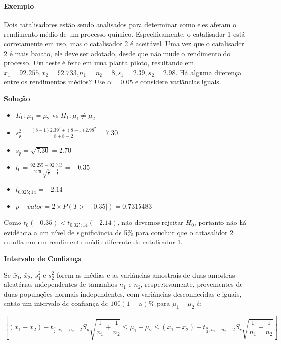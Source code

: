 \documentclass[
]{book}
\providecommand{\tightlist}{%
  \setlength{\itemsep}{0pt}\setlength{\parskip}{0pt}}
\begin{document}
\hypertarget{exemplo-11}{%
\paragraph{Exemplo}\label{exemplo-11}}

Dois catalisadores estão sendo analisados para determinar como eles afetam o rendimento médio de um processo químico. Especificamente, o catalisador 1 está corretamente em uso, mas o catalisador 2 é aceitável. Uma vez que o catalisador 2 é mais barato, ele deve ser adotado, desde que não mude o rendimento do processo. Um teste é feito em uma planta piloto, resultando em \(\bar x_1=92.255, \bar x_2=92.733, n_1=n_2=8, s_1=2.39, s_2=2.98\). Há alguma diferença entre os rendimentos médios? Use \(\alpha=0.05\) e considere variâncias iguais.

\textbf{Solução}

\begin{itemize}
\tightlist
\item
  \(H_0: \mu_1=\mu_2\) vs \(H_1: \mu_1\ne\mu_2\)
\item
  \(s^2_p=\frac{(8-1)2.39^2+(8-1)2.98^2}{8+8-2}=7.30\)
\item
  \(s_p=\sqrt{7.30}=2.70\)
\item
  \(t_0=\frac{92.255-92.733}{2.70\sqrt{\frac{1}{8}+\frac{1}{8}}}=-0.35\)
\item
  \(t_{0.025;14}=-2.14\)
\item
  \(p-valor=2\times P(T>|-0.35|)=0.7315483\)
\end{itemize}

Como \(t_0(-0.35)<t_{0.025;14}(-2.14)\), não devemos rejeitar \(H_0\), portanto não há evidência a um nível de significância de 5\% para concluir que o catasalidor 2 resulta em um rendimento médio diferente do catalisador 1.

\textbf{Intervalo de Confiança}

Se \(\bar x_1\), \(\bar x_2\), \(s_1^2\) e \(s_2^2\) forem as médias e as variâncias amostrais de duas amostras aleatórias independentes de tamanhos \(n_1\) e \(n_2\), respectivamente, provenientes de duas populações normais independentes, com variâncias desconhecidas e iguais, então um intervalo de confiança de \(100(1-\alpha)\%\) para \(\mu_1-\mu_2\) é:

\[\left[(\bar x_1-\bar x_2) -t_{\frac{\alpha}{2};n_1+n_2-2}S_p\sqrt{\frac{1}{n_1}+\frac{1}{n_2}}\leq \mu_1-\mu_2 \leq (\bar x_1-\bar x_2) +t_{\frac{\alpha}{2};n_1+n_2-2}S_p\sqrt{\frac{1}{n_1}+\frac{1}{n_2}}\right]\]
\end{document}
